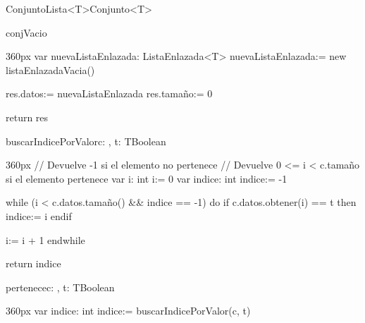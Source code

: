 \documentclass[10pt,a4paper]{article}
\begin{document}
\begin{ModuloImplements}{ConjuntoLista<T>}{Conjunto<T>}
  \begin{Vars}
  \end{Vars}
 
   {
  }

  \vspace{1em}
  \begin{proc}{conjVacio}{}{}
    \begin{ImplementationCode}{360px}
      var nuevaListaEnlazada: ListaEnlazada<T>
          nuevaListaEnlazada:= new listaEnlazadaVacia()

      res.datos:= nuevaListaEnlazada
      res.tamaño:= 0

      return res
    \end{ImplementationCode}
  \end{proc}
  \begin{proc}{buscarIndicePorValor}{\In c: , \In t: T}{Boolean}
    \begin{ImplementationCode}{360px}
      // Devuelve -1 si el elemento no pertenece
      // Devuelve 0 <= i < c.tamaño si el elemento pertenece
      var i: int
          i:= 0
      var indice: int
          indice:= -1
      
      while (i < c.datos.tamaño() && indice == -1) do
        if c.datos.obtener(i) == t then
          indice:= i
        endif
  
        i:= i + 1
      endwhile
  
      return indice
    \end{ImplementationCode}
  \end{proc}

  \begin{proc}{pertenece}{\In c: , \In t: T}{Boolean}
    \begin{ImplementationCode}{360px}
      var indice: int
          indice:= buscarIndicePorValor(c, t)


\end{ImplementationCode}
\end{proc}
\end{ModuloImplements}
\end{document}
